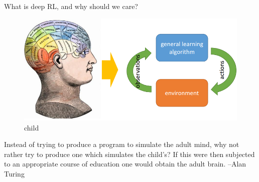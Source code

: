 What is deep RL, and why should we care?
\begin{figure}[h!] %
	\centering
	\includegraphics[width=0.5\linewidth]{img/1-human.png}
	\caption{child}\label{img:1-human}
\end{figure}

Instead of trying to produce a
program to simulate the adult
mind, why not rather try to
produce one which simulates the
child's? If this were then subjected
to an appropriate course of
education one would obtain the
adult brain. --Alan Turing





